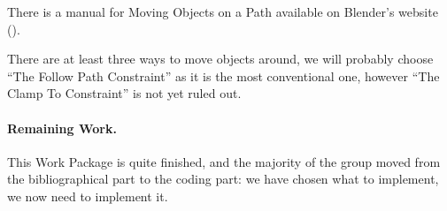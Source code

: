 \par There is a manual for Moving Objects on a Path available on Blender's website (\cite{manual_moving}).

\par There are at least three ways to move objects around, we will probably choose ``The Follow Path Constraint'' as it is the most conventional one, however ``The Clamp To Constraint'' is not yet ruled out.





\paragraph{Remaining Work.}
This Work Package is quite finished, and the majority of the group moved from the bibliographical part to the coding part: we have chosen what to implement, we now need to implement it. 
